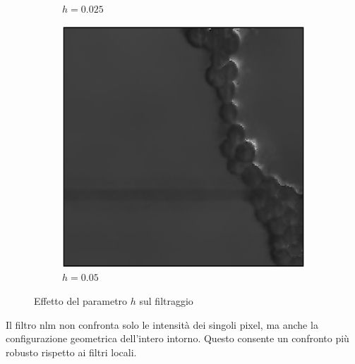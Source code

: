 \documentclass[../main.tex]{subfiles}
\begin{document}
\begin{figure}[ht]
\begin{subfigure}{0.32\linewidth}
			\caption{$h = 0.025$}
		\end{subfigure}
		\begin{subfigure}{0.32\linewidth}
			\includegraphics[keepaspectratio, width=\linewidth]{images/nlm_005.png}
			\caption{$h = 0.05$}
		\end{subfigure}
		\caption{Effetto del parametro $h$ sul filtraggio}
	\end{figure}
	
	Il filtro \acrshort{nlm} non confronta solo le intensità dei singoli pixel, ma anche la configurazione geometrica dell'intero intorno. Questo consente un confronto più robusto rispetto ai filtri locali.
	
\end{document}
